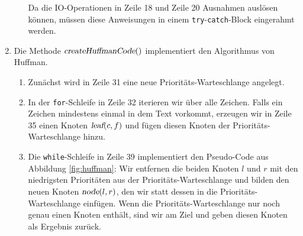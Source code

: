 \begin{enumerate}
\begin{enumerate}
            Da die IO-Operationen in Zeile 18 und Zeile 20 Ausnahmen ausl\"osen k\"onnen,
            m\"ussen diese Anweisungen in einem \texttt{try}-\texttt{catch}-Block eingerahmt
            werden.
      \end{enumerate}
\item Die Methode $\textsl{createHuffmanCode}()$ implementiert den Algorithmus von Huffman.
      \begin{enumerate}
      \item Zun\"achst wird in Zeile 31 eine neue Priorit\"ats-Warteschlange angelegt.
      \item In der \texttt{for}-Schleife in Zeile 32 iterieren wir \"uber alle Zeichen.
            Falls ein Zeichen mindestens einmal in dem Text vorkommt,
            erzeugen wir in Zeile 35 einen Knoten $\textsl{leaf}(c,f)$ und f\"ugen diesen
            Knoten der Priorit\"ats-Warteschlange hinzu.
      \item Die \texttt{while}-Schleife in Zeile 39 implementiert den Pseudo-Code aus 
            Abbildung \ref{fig:huffman}:  Wir entfernen die beiden Knoten $l$ und $r$ mit den
            niedrigsten Priorit\"aten aus der Priorit\"ats-Warteschlange und bilden den neuen
            Knoten $\textsl{node}(l,r)$, den wir statt dessen in die
            Priorit\"ats-Warteschlange einf\"ugen.  Wenn die Priorit\"ats-Warteschlange nur noch
            genau einen Knoten enth\"alt, sind wir am Ziel und geben diesen Knoten 
            als Ergebnis zur\"uck.
      \end{enumerate}
\end{enumerate}

